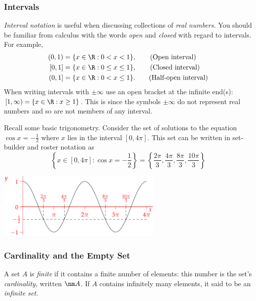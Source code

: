 \subsubsection*{Intervals}

\emph{Interval notation} is useful when discussing collections of \emph{real numbers.} You should be familiar from calculus with the words \emph{open} and \emph{closed} with regard to intervals. For example,
\begin{align*}
(0,1)&=\{x\in\R:0<x<1\},\tag*{(Open interval)}\\
[0,1]&=\{x\in\R:0\le x\le 1\},\tag*{(Closed interval)}\\
(0,1]&=\{x\in\R:0<x\le 1\}.\tag*{(Half-open interval)}
\end{align*}
When writing intervals with $\pm\infty$ use an open bracket at the infinite end(s): $[1,\infty)=\{x\in\R:x\ge 1\}$. This is since the symbols $\pm\infty$ do not represent real numbers and so are not members of any interval.

\begin{example}
Recall some basic trigonometry. Consider the set of solutions to the equation $\cos x=-\frac 12$ where $x$ lies in the interval $[0,4\pi]$. This set can be written in set-builder and roster notation as
\[\left\{x\in[0,4\pi]:\cos x=-\frac 12\right\}=\left\{\frac{2\pi}3,\frac{4\pi}3,\frac{8\pi}3,\frac{10\pi}3\right\}\]
\begin{center}
\includegraphics[width=0.6\textwidth]{sets-03-cos}
\end{center}
\end{example}

\subsubsection*{Cardinality and the Empty Set}

\begin{defn}
A set $A$ is \emph{finite} if it contains a finite number of elements: this number is the set's \emph{cardinality,} written $\nm A$. If $A$ contains infinitely many elements, it said to be an \emph{infinite set.}
\end{defn}

